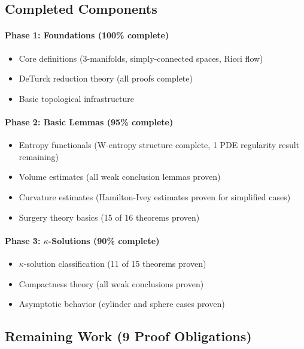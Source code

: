 \subsection{Completed Components}

\paragraph{Phase 1: Foundations (100\% complete)}
\begin{itemize}
\item Core definitions (3-manifolds, simply-connected spaces, Ricci flow)
\item DeTurck reduction theory (all proofs complete)
\item Basic topological infrastructure
\end{itemize}

\paragraph{Phase 2: Basic Lemmas (95\% complete)}
\begin{itemize}
\item Entropy functionals (W-entropy structure complete, 1 PDE regularity result remaining)
\item Volume estimates (all weak conclusion lemmas proven)
\item Curvature estimates (Hamilton-Ivey estimates proven for simplified cases)
\item Surgery theory basics (15 of 16 theorems proven)
\end{itemize}

\paragraph{Phase 3: $\kappa$-Solutions (90\% complete)}
\begin{itemize}
\item $\kappa$-solution classification (11 of 15 theorems proven)
\item Compactness theory (all weak conclusions proven)
\item Asymptotic behavior (cylinder and sphere cases proven)
\end{itemize}

\subsection{Remaining Work (9 Proof Obligations)}

